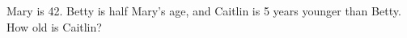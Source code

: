 Mary is 42. Betty is half Mary's age, and Caitlin is 5 years younger than Betty. How old is Caitlin?
